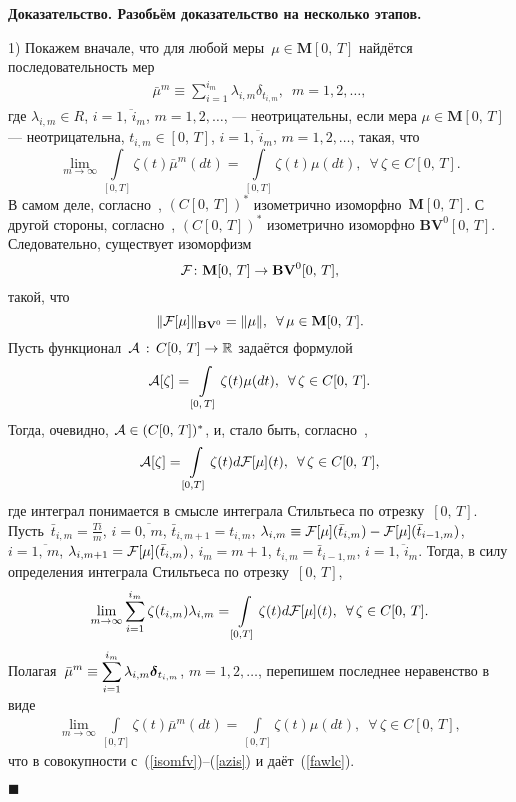 \documentclass{report}
\newenvironment{Proof}{\par\noindent\bf Доказательство.\rm}{ $\blacksquare$\par}
\newcommand{\mydelta}{\text{\mathversion{bold}$\delta$\mathversion{normal}}}
\begin{document}
\begin{Proof} Разобьём доказательство на несколько этапов.

1) Покажем вначале, что для любой меры~$\mu\in \mathbf{M}[0,\,T]$ найдётся последовательность мер
\begin{gather*}
\bar{\mu}^m\equiv\sum\limits_{i=1}^{i_m}\lambda_{i,m}\delta_{t_{i,m}},\,\,\,m=1,2,\dots,
\end{gather*}
где $\lambda_{i,m}\in R$, $i= \overline{1,\,i_m}$, $m=1,2,\dots$, --- неотрицательны, если мера $\mu\in \mathbf{M}[0,\,T]$ --- неотрицательна, $t_{i,m}\in[0,\,T]$, $i=\overline{1,\,i_m}$,
$m=1,2,\dots$, такая, что
\begin{equation}\label{fawlc}
\lim\limits_{m\to\infty}\int\limits_{[0,T]}\zeta(t)\bar{\mu}^m(dt)= \int\limits_{[0,T]}\zeta(t){\mu}(dt),\,\,\,\forall\,\zeta\in C[0,\,T].
\end{equation}
В самом деле, согласно~\cite{warga}, $(C[0,\,T])^*$ изометрично изоморфно~$\mathbf{M}[0,\,T]$. С другой стороны, согласно~\cite{KF}, $(C[0,\,T])^*$ изометрично изоморфно
$\mathbf{BV}^0[0,\,T]$. Следовательно, существует изоморфизм $${\cal F}\colon \mathbf{M}[0,\,T]\to\mathbf{BV}^0[0,\,T],$$ такой, что
\begin{equation}\label{isomfv}
\|{\cal F}[\mu]\|_{\mathbf{BV}^0}=\|\mu\|,\,\,\,\forall\,\mu\in \mathbf{M}[0,\,T].
\end{equation}
Пусть функционал~${\cal A}\,:\,C[0,\,T]\to \mathbb{R}$ задаётся формулой
\begin{equation}\label{ffunca}
{\cal A}[\zeta]=\int\limits_{[0,\,T]}\zeta(t)\mu(dt),\,\,\,\forall\,\zeta\in C[0,\,T].
\end{equation}
Тогда, очевидно, ${\cal A}\in(C[0,\,T])^*$, и, стало быть, согласно~\cite{KF},
\begin{equation}\label{azis}
{\cal A}[\zeta]=\int\limits_{[0,T]}\zeta(t)d{\cal F}[\mu](t),\,\,\,\forall\,\zeta \in C[0,\,T],
\end{equation}
где интеграл понимается в смысле интеграла Стильтьеса по отрезку~$[0,\,T]$. Пусть~$\bar{t}_{i,m}= \frac{Ti}{m}$, $i=\overline{0,\,m}$, $\bar{t}_{i,m+1}=t_{i,m}$, $\lambda_{i,m}\equiv
{\cal F}[\mu](\bar{t}_{i,m})-{\cal F}[\mu](\bar{t}_{i-1,m})$, $i= \overline{1,\,m}$, $\lambda_{i,m+1}={\cal F}[\mu](\bar{t}_{i,m})$, $i_m=m+1$, $t_{i,m}= \bar{t}_{i-1,m}$,
$i=\overline{1,\,i_m}$. Тогда, в силу определения интеграла Стильтьеса по отрезку~$[0,\,T]$,
\begin{gather*}
\displaystyle\lim\limits_{m\to\infty}\sum\limits_{i=1}^{i_m}\zeta(t_{i,m})\lambda_{i,m}= \int\limits_{[0,T]}\zeta(t)d{\cal F}[\mu](t),\,\,\,
\forall\,\zeta \in C[0,\,T].
\end{gather*}
Полагая~$\displaystyle\bar{\mu}^m\equiv\sum\limits_{i=1}^{i_m} \lambda_{i,m}\mydelta_{t_{i,m}}$, $m=1,2,\dots$, перепишем последнее неравенство в виде
\begin{gather*}
\lim\limits_{m\to\infty}\int\limits_{[0,T]}\zeta(t)\bar{\mu}^m(dt)= \int\limits_{[0,T]}\zeta(t){\mu}(dt),\,\,\,\forall\,\zeta\in C[0,\,T],
\end{gather*}
что в совокупности с~(\ref{isomfv})--(\ref{azis}) и даёт~(\ref{fawlc}).


\end{Proof}
\end{document}
